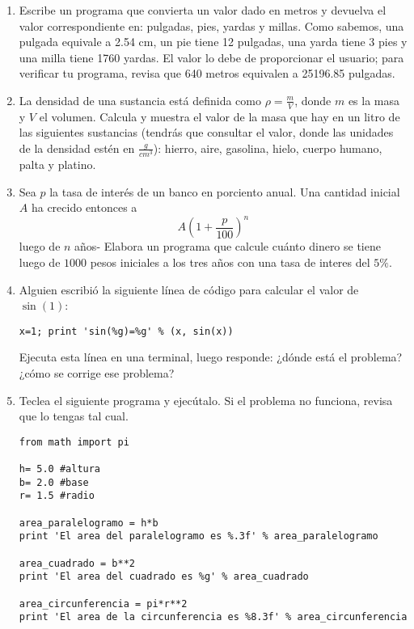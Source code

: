 \documentclass[12pt]{article}
\begin{document}
\begin{enumerate}
\item Escribe un programa que convierta un valor dado en metros y devuelva el valor correspondiente en: pulgadas, pies, yardas y millas. Como sabemos, una pulgada equivale a 2.54 cm, un pie tiene 12 pulgadas, una yarda tiene 3 pies y una milla tiene 1760 yardas. El valor lo debe de proporcionar el usuario; para verificar tu programa, revisa que 640 metros equivalen a 25196.85 pulgadas.
\item La densidad de una sustancia está definida como $\rho = \frac{m}{V}$, donde $m$ es la masa y $V$ el volumen. Calcula y muestra el valor de la masa que hay en un litro de las siguientes sustancias (tendrás que consultar el valor, donde las unidades de la densidad estén en $\frac{g}{cm^{3}}$): hierro, aire, gasolina, hielo, cuerpo humano, palta y platino.
\item Sea $p$ la tasa de interés de un banco en porciento anual. Una cantidad inicial $A$ ha crecido entonces a
\[ A \left( 1 + \dfrac{p}{100} \right)^{n} \]
luego de $n$ años- Elabora un programa que calcule cuánto dinero se tiene luego de $1000$ pesos iniciales a los tres años con una tasa de interes del $5\%$.
\item Alguien escribió la siguiente línea de código para calcular el valor de $\sin(1)$:
\begin{verbatim}
x=1; print 'sin(%g)=%g' % (x, sin(x))
\end{verbatim}
Ejecuta esta línea en una terminal, luego responde: ¿dónde está el problema?¿cómo se corrige ese problema?
\item Teclea el siguiente programa y ejecútalo. Si el problema no funciona, revisa que lo tengas tal cual.
\begin{verbatim}
from math import pi

h= 5.0 #altura
b= 2.0 #base
r= 1.5 #radio

area_paralelogramo = h*b
print 'El area del paralelogramo es %.3f' % area_paralelogramo

area_cuadrado = b**2
print 'El area del cuadrado es %g' % area_cuadrado

area_circunferencia = pi*r**2
print 'El area de la circunferencia es %8.3f' % area_circunferencia


\end{verbatim}
\end{enumerate}
\end{document}
